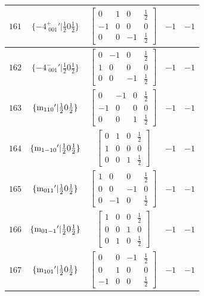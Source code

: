 \documentclass[fleqn,8pt]{jsarticle}
\begin{document}
\begin{longtable}{ccccc}
$ 161 $ & $ \{-4^{+}_{\,\,001}{}'|\frac{1}{2} 0 \frac{1}{2}\} $ & $ \begin{bmatrix} 0 & 1 & 0 & \frac{1}{2} \\ -1 & 0 & 0 & 0 \\ 0 & 0 & -1 & \frac{1}{2} \end{bmatrix} $ & $ -1 $ & $ -1 $ \\ \hline
$ 162 $ & $ \{-4^{-}_{\,\,001}{}'|\frac{1}{2} 0 \frac{1}{2}\} $ & $ \begin{bmatrix} 0 & -1 & 0 & \frac{1}{2} \\ 1 & 0 & 0 & 0 \\ 0 & 0 & -1 & \frac{1}{2} \end{bmatrix} $ & $ -1 $ & $ -1 $ \\ \hline
$ 163 $ & $ \{{\rm m}_{110}{}'|\frac{1}{2} 0 \frac{1}{2}\} $ & $ \begin{bmatrix} 0 & -1 & 0 & \frac{1}{2} \\ -1 & 0 & 0 & 0 \\ 0 & 0 & 1 & \frac{1}{2} \end{bmatrix} $ & $ -1 $ & $ -1 $ \\ \hline
$ 164 $ & $ \{{\rm m}_{1-10}{}'|\frac{1}{2} 0 \frac{1}{2}\} $ & $ \begin{bmatrix} 0 & 1 & 0 & \frac{1}{2} \\ 1 & 0 & 0 & 0 \\ 0 & 0 & 1 & \frac{1}{2} \end{bmatrix} $ & $ -1 $ & $ -1 $ \\ \hline
$ 165 $ & $ \{{\rm m}_{011}{}'|\frac{1}{2} 0 \frac{1}{2}\} $ & $ \begin{bmatrix} 1 & 0 & 0 & \frac{1}{2} \\ 0 & 0 & -1 & 0 \\ 0 & -1 & 0 & \frac{1}{2} \end{bmatrix} $ & $ -1 $ & $ -1 $ \\ \hline
$ 166 $ & $ \{{\rm m}_{01-1}{}'|\frac{1}{2} 0 \frac{1}{2}\} $ & $ \begin{bmatrix} 1 & 0 & 0 & \frac{1}{2} \\ 0 & 0 & 1 & 0 \\ 0 & 1 & 0 & \frac{1}{2} \end{bmatrix} $ & $ -1 $ & $ -1 $ \\ \hline
$ 167 $ & $ \{{\rm m}_{101}{}'|\frac{1}{2} 0 \frac{1}{2}\} $ & $ \begin{bmatrix} 0 & 0 & -1 & \frac{1}{2} \\ 0 & 1 & 0 & 0 \\ -1 & 0 & 0 & \frac{1}{2} \end{bmatrix} $ & $ -1 $ & $ -1 $ \\ \hline

\end{longtable}
\end{document}
